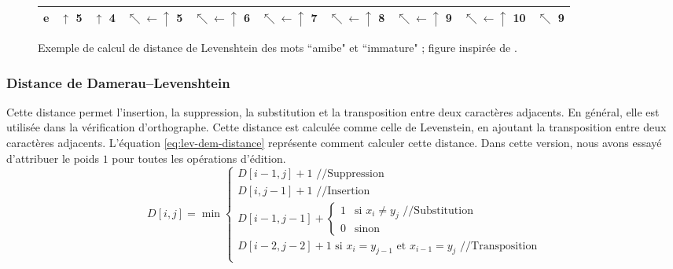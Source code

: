 \documentclass{KodeBook}
\begin{document}
\begin{figure}[ht]
\begin{tabular}{|r|r|r|r|r|r|r|r|r|r|}
		\hline
		\bfseries e & $ \uparrow $ 5 & $ \uparrow $ 4 & $\nwarrow\leftarrow\uparrow $ 5 & $\nwarrow\leftarrow\uparrow $ 6 & $\nwarrow\leftarrow\uparrow $ 7 & $\nwarrow\leftarrow\uparrow $ 8 & $\nwarrow\leftarrow\uparrow $ 9 & $\nwarrow\leftarrow\uparrow $ 10 & \cellcolor{green!25} $\nwarrow $ 9\\
		\hline
	\end{tabular}
	\caption[Exemple de calcul de distance de Levenshtein.]{Exemple de calcul de distance de Levenshtein des mots ``amibe"  et ``immature" ; figure inspirée de \cite{2019-jurafsky-martin}.}
	\label{fig:laven-distance}
\end{figure}

\subsubsection{Distance de Damerau–Levenshtein}

Cette distance permet l'insertion, la suppression, la substitution et la transposition entre deux caractères adjacents.
En général, elle est utilisée dans la vérification d'orthographe.
Cette distance est calculée comme celle de Levenstein, en ajoutant la transposition entre deux caractères adjacents.
L'équation \ref{eq:lev-dem-distance} représente comment calculer cette distance.
Dans cette version, nous avons essayé d'attribuer le poids $1$ pour toutes les opérations d'édition.
\begin{equation}
D[i, j] = \min 
	\begin{cases}
		D[i - 1, j] + 1 \text{ //Suppression}\\
		D[i, j-1] + 1 \text{ //Insertion}\\
		D[i-1, j-1] + \begin{cases}
			1 & \text{si } x_i \ne y_j \text{ //Substitution}\\
			0 & \text{sinon}
		\end{cases}\\
		D[i-2, j-2] + 1 \text{ si } x_i = y_{j-1} \text{ et } x_{i-1} = y_j \text{ //Transposition}\\
	\end{cases}
	\label{eq:lev-dem-distance}
\end{equation}
\end{document}
